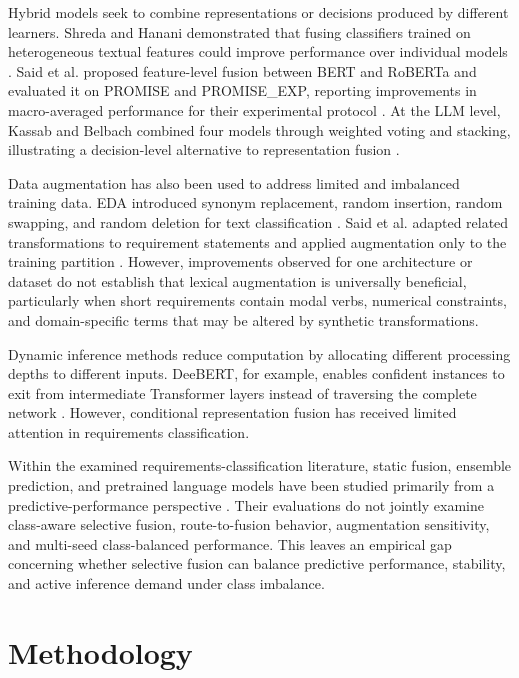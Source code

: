 \documentclass[runningheads]{llncs}
\begin{document}
Hybrid models seek to combine representations or decisions produced by different learners. Shreda and Hanani demonstrated that fusing classifiers trained on heterogeneous textual features could improve performance over individual models \cite{shreda_nfr_nlp}. Said et al. proposed feature-level fusion between BERT and RoBERTa and evaluated it on PROMISE and PROMISE\_EXP, reporting improvements in macro-averaged performance for their experimental protocol \cite{said_functional_nonfunctional}. At the LLM level, Kassab and Belbach combined four models through weighted voting and stacking, illustrating a decision-level alternative to representation fusion \cite{kassab_ensemble_requirements}.

Data augmentation has also been used to address limited and imbalanced training data. EDA introduced synonym replacement, random insertion, random swapping, and random deletion for text classification \cite{wei_eda}. Said et al. adapted related transformations to requirement statements and applied augmentation only to the training partition \cite{said_functional_nonfunctional}. However, improvements observed for one architecture or dataset do not establish that lexical augmentation is universally beneficial, particularly when short requirements contain modal verbs, numerical constraints, and domain-specific terms that may be altered by synthetic transformations.

Dynamic inference methods reduce computation by allocating different processing depths to different inputs. DeeBERT, for example, enables confident instances to exit from intermediate Transformer layers instead of traversing the complete network \cite{xin_deebert}. However, conditional representation fusion has received limited attention in requirements classification.

Within the examined requirements-classification literature, static fusion, ensemble prediction, and pretrained language models have been studied primarily from a predictive-performance perspective \cite{khan_transfer_requirements,shafikuzzaman_fewshot_requirements,kassab_ensemble_requirements,said_functional_nonfunctional}. Their evaluations do not jointly examine class-aware selective fusion, route-to-fusion behavior, augmentation sensitivity, and multi-seed class-balanced performance. This leaves an empirical gap concerning whether selective fusion can balance predictive performance, stability, and active inference demand under class imbalance.

\section{Methodology}\label{sec:methodology}
\end{document}
